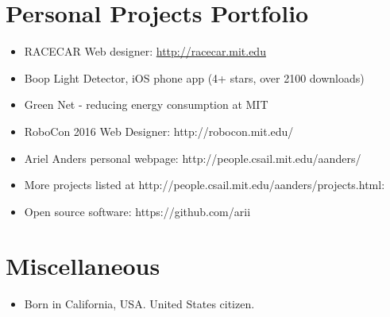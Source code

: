 \documentclass[10pt,letterpaper]{article}
\begin{document}
\section*{Personal Projects Portfolio}
\begin{itemize}
\item RACECAR Web designer: \url{http://racecar.mit.edu}
\item Boop Light Detector, iOS phone app (4+ stars, over 2100 downloads)
\item Green Net - reducing energy consumption at MIT
\item RoboCon 2016 Web Designer: http://robocon.mit.edu/
\item Ariel Anders personal webpage: http://people.csail.mit.edu/aanders/
\item More projects listed at http://people.csail.mit.edu/aanders/projects.html:
\item Open source software: https://github.com/arii
\end{itemize}

\section*{Miscellaneous}

\begin{itemize}
\item Born in California, USA. United States citizen.
\end{itemize}
\end{document}
